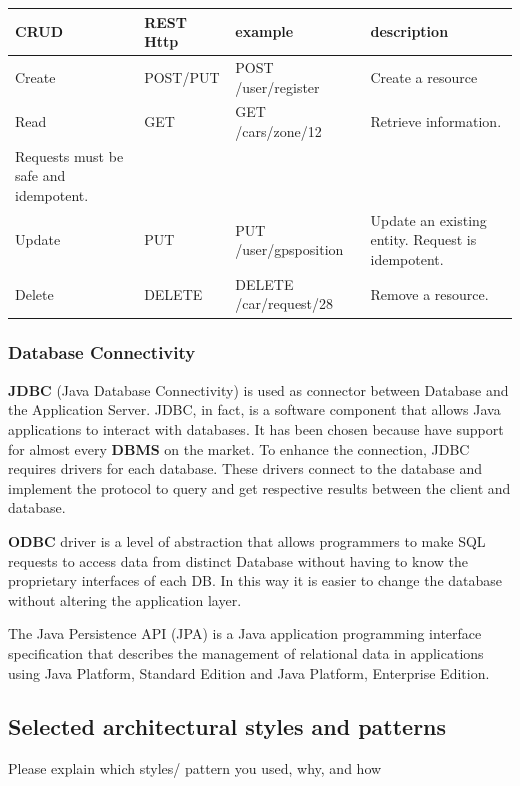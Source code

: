 \begin{center}
	\begin{adjustbox}{max width=\textwidth}	
		\begin{tabular}{|l|>{\raggedright}p{2.5cm}|>{\raggedright}p{4.5cm}|>{\raggedright}p{5cm}|}
			\hline 
			CRUD & REST Http & example &description\tabularnewline
			\hline 
			
			Create & POST/PUT & POST /user/register  & Create a resource \tabularnewline
			\hline 
			Read & GET & GET /cars/zone/12 & Retrieve information. \\  Requests must be safe and idempotent.\tabularnewline
			\hline 
			Update & PUT & PUT /user/gpsposition & Update an existing entity. Request is idempotent. \tabularnewline
			\hline 
			Delete & DELETE & DELETE /car/request/28 & Remove a resource.\tabularnewline
			\hline 
		\end{tabular}
	\end{adjustbox}	
	\par\end{center}

\subsubsection{Database Connectivity} \textbf{JDBC} (Java Database Connectivity) is used as connector between Database and the Application Server. JDBC, in fact, is a software component that allows Java applications to interact with databases. It has been chosen because have support for almost every \textbf{DBMS} on the market.
To enhance the connection, JDBC requires drivers for each database. These drivers connect to the database and implement the protocol to query and get respective results between the client and database. 


\textbf{ODBC} driver is a level of abstraction that allows programmers to make SQL requests to access data from distinct Database without having to know the proprietary interfaces of each DB. In this way it is easier to change the database without altering the application layer.


The Java Persistence API (JPA) is a Java application programming interface specification that describes the management of relational data in applications using Java Platform, Standard Edition and Java Platform, Enterprise Edition.



\subsection{Selected architectural styles and patterns}
Please explain which styles/ pattern you used, why, and how
